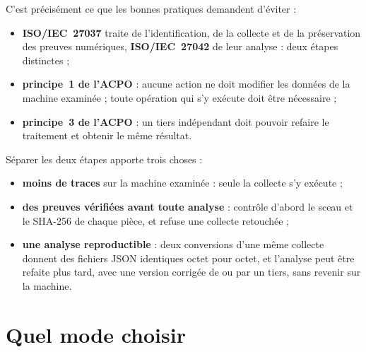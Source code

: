 \documentclass[11pt,a4paper,oneside]{report}
\begin{document}
C'est précisément ce que les bonnes pratiques demandent d'éviter :
\begin{itemize}
  \item \textbf{ISO/IEC~27037} traite de l'identification, de la collecte et de
        la préservation des preuves numériques, \textbf{ISO/IEC~27042} de leur
        analyse : deux étapes distinctes ;
  \item \textbf{principe~1 de l'ACPO} : aucune action ne doit modifier les
        données de la machine examinée ; toute opération qui s'y exécute doit
        être nécessaire ;
  \item \textbf{principe~3 de l'ACPO} : un tiers indépendant doit pouvoir
        refaire le traitement et obtenir le même résultat.
\end{itemize}

Séparer les deux étapes apporte trois choses :
\begin{itemize}
  \item \textbf{moins de traces} sur la machine examinée : seule la collecte
        s'y exécute ;
  \item \textbf{des preuves vérifiées avant toute analyse} : 
        contrôle d'abord le sceau et le SHA-256 de chaque pièce, et refuse une
        collecte retouchée ;
  \item \textbf{une analyse reproductible} : deux conversions d'une même
        collecte donnent des fichiers JSON identiques octet pour octet, et
        l'analyse peut être refaite plus tard, avec une version corrigée de
        \wac{} ou par un tiers, sans revenir sur la machine.
\end{itemize}

\section{Quel mode choisir}
\end{document}
